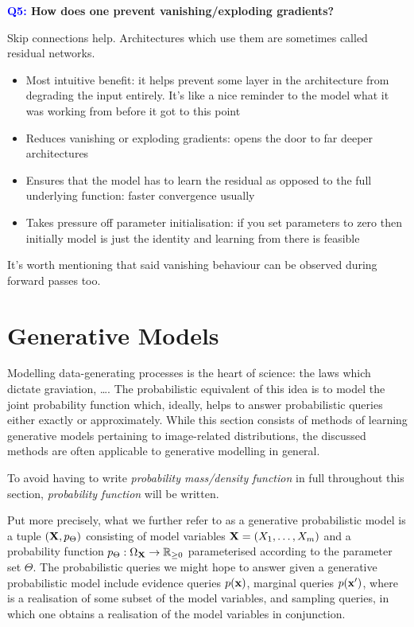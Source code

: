 \documentclass[11pt]{article}
\begin{document}
\begin{center}
    \textbf{\textcolor{blue}{Q5:} How does one prevent vanishing/exploding gradients?}
\end{center}
Skip connections help. Architectures which use them are sometimes called residual networks.
\begin{itemize}
    \item Most intuitive benefit: it helps prevent some layer in the architecture from degrading the input entirely. It's like a nice reminder to the model what it was working from before it got to this point
    \item Reduces vanishing or exploding gradients: opens the door to far deeper architectures
    \item Ensures that the model has to learn the residual as opposed to the full underlying function: faster convergence usually
    \item Takes pressure off parameter initialisation: if you set parameters to zero then initially model is just the identity and learning from there is feasible
\end{itemize}
It's worth mentioning that said vanishing behaviour can be observed during forward passes too.

\section{Generative Models}
Modelling data-generating processes is the heart of science: the laws which dictate graviation, \dots. The probabilistic equivalent of this idea is to model the joint probability function which, ideally, helps to answer probabilistic queries either exactly or approximately. While this section consists of methods of learning generative models pertaining to image-related distributions, the discussed methods are often applicable to generative modelling in general.

\begin{tcolorbox}[title={\centering\textbf{Terminology}}, colback=myLightBlue, colbacktitle=myDarkBlue, colframe=myDarkBlue, coltitle=white]
    To avoid having to write \textit{probability mass/density function} in full throughout this section, \textit{probability function} will be written.
\end{tcolorbox}

Put more precisely, what we further refer to as a generative probabilistic model is a tuple $(\mathbf{X}, p_{\Theta})$ consisting of model variables $\mathbf{X}=(X_1,\dots,X_m)$ and a probability function $p_{\Theta}:\Omega_{\mathbf{X}}\rightarrow\mathbb{R}_{\geq0}$ parameterised according to the parameter set $\Theta$. The probabilistic queries we might hope to answer given a generative probabilistic model include evidence queries $p(\mathbf{x})$, marginal queries $p(\mathbf{x}')$, where is a realisation of some subset of the model variables, and sampling queries, in which one obtains a realisation of the model variables in conjunction.
\end{document}
